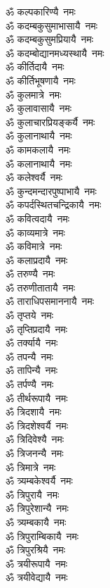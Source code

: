 \begin{flushleft}
\begin{multicols}{2}
ॐ कल्पकारिण्यै~नमः\\
ॐ कदम्बकुसुमाभासायै~नमः\\
ॐ कदम्बकुसुमप्रियायै~नमः\\
ॐ कदम्बोद्यानमध्यस्थायै~नमः\\
ॐ कीर्तिदायै~नमः\\
ॐ कीर्तिभूषणायै~नमः\\
ॐ कुलमात्रे~नमः\\
ॐ कुलावासायै~नमः\\
ॐ कुलाचारप्रियङ्कर्यै~नमः\hfill{}\\
ॐ कुलानाथायै~नमः\\
ॐ कामकलायै~नमः\\
ॐ कलानाथायै~नमः\\
ॐ कलेश्वर्यै~नमः\\
ॐ कुन्दमन्दारपुष्पाभायै~नमः\\
ॐ कपर्दस्थितचन्द्रिकायै~नमः\\
ॐ कवित्वदायै~नमः\\
ॐ काव्यमात्रे~नमः\\
ॐ कविमात्रे~नमः\\
ॐ कलाप्रदायै~नमः\hfill{}\\
ॐ तरुण्यै~नमः\\
ॐ तरुणीतातायै~नमः\\
ॐ ताराधिपसमाननायै~नमः\\
ॐ तृप्तये~नमः\\
ॐ तृप्तिप्रदायै~नमः\\
ॐ तर्क्यायै~नमः\\
ॐ तपन्यै~नमः\\
ॐ तापिन्यै~नमः\\
ॐ तर्पण्यै~नमः\\
ॐ तीर्थरूपायै~नमः\hfill{}\\
ॐ त्रिदशायै~नमः\\
ॐ त्रिदशेश्वर्यै~नमः\\
ॐ त्रिदिवेश्यै~नमः\\
ॐ त्रिजनन्यै~नमः\\
ॐ त्रिमात्रे~नमः\\
ॐ त्र्यम्बकेश्वर्यै~नमः\\
ॐ त्रिपुरायै~नमः\\
ॐ त्रिपुरेशान्यै~नमः\\
ॐ त्र्यम्बकायै~नमः\\
ॐ त्रिपुराम्बिकायै~नमः\hfill{}\\
ॐ त्रिपुरश्रियै~नमः\\
ॐ त्रयीरूपायै~नमः\\
ॐ त्रयीवेद्यायै~नमः\\

\end{multicols}
\end{flushleft}
